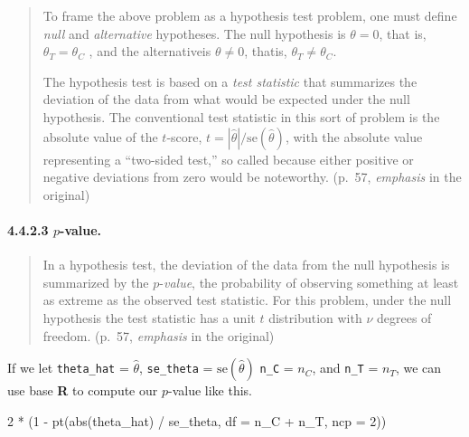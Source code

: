 \documentclass[
]{article}
\newenvironment{Shaded}{\begin{snugshade}}{\end{snugshade}}
\newcommand{\AttributeTok}[1]{\textcolor[rgb]{0.77,0.63,0.00}{#1}}
\newcommand{\DecValTok}[1]{\textcolor[rgb]{0.00,0.00,0.81}{#1}}
\newcommand{\FunctionTok}[1]{\textcolor[rgb]{0.00,0.00,0.00}{#1}}
\newcommand{\NormalTok}[1]{#1}
\newcommand{\SpecialCharTok}[1]{\textcolor[rgb]{0.00,0.00,0.00}{#1}}
\begin{document}
\begin{quote}
To frame the above problem as a hypothesis test problem, one must define
\emph{null} and \emph{alternative} hypotheses. The null hypothesis is
\(\theta = 0\), that is, \(\theta_T = \theta_C\) , and the alternativeis
\(\theta \neq 0\), thatis, \(\theta_T \neq \theta_C\).

The hypothesis test is based on a \emph{test statistic} that summarizes
the deviation of the data from what would be expected under the null
hypothesis. The conventional test statistic in this sort of problem is
the absolute value of the \(t\)-score,
\(t = |\hat \theta| / \text{se}(\hat \theta)\), with the absolute value
representing a ``two-sided test,'' so called because either positive or
negative deviations from zero would be noteworthy. (p.~57,
\emph{emphasis} in the original)
\end{quote}

\hypertarget{p-value.}{%
\paragraph{\texorpdfstring{4.4.2.3
\(p\)-value.}{4.4.2.3 p-value.}}\label{p-value.}}

\begin{quote}
In a hypothesis test, the deviation of the data from the null hypothesis
is summarized by the \(p\)-\emph{value}, the probability of observing
something at least as extreme as the observed test statistic. For this
problem, under the null hypothesis the test statistic has a unit \(t\)
distribution with \(\nu\) degrees of freedom. (p.~57, \emph{emphasis} in
the original)
\end{quote}

If we let \texttt{theta\_hat} = \(\hat \theta\), \texttt{se\_theta} =
\(\text{se}(\hat \theta)\) \texttt{n\_C} = \(n_C\), and \texttt{n\_T} =
\(n_T\), we can use base \textbf{R} to compute our \(p\)-value like
this.

\begin{Shaded}
\begin{Highlighting}[]
\DecValTok{2} \SpecialCharTok{*}\NormalTok{ (}\DecValTok{1} \SpecialCharTok{{-}} \FunctionTok{pt}\NormalTok{(}\FunctionTok{abs}\NormalTok{(theta\_hat) }\SpecialCharTok{/}\NormalTok{ se\_theta, }\AttributeTok{df =}\NormalTok{ n\_C }\SpecialCharTok{+}\NormalTok{ n\_T, }\AttributeTok{ncp =} \DecValTok{2}\NormalTok{))}
\end{Highlighting}
\end{Shaded}
\end{document}
